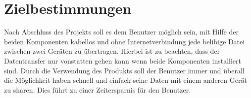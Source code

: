 \section{Zielbestimmungen}
Nach Abschluss des Projekts soll es dem Benutzer möglich sein, mit Hilfe der beiden Komponenten kabellos und ohne Internetverbindung jede belibige Datei zwischen zwei Geräten zu übertragen. Hierbei ist zu beachten, dass der Datentransfer nur vonstatten gehen kann wenn beide Komponenten installiert sind.
Durch die Verwendung des Produkts soll der Benutzer immer und überall die Möglichkeit haben schnell und einfach seine Daten mit einem anderen Gerät zu sharen. Dies führt zu einer  Zeitersparnis für den Benutzer.\\
